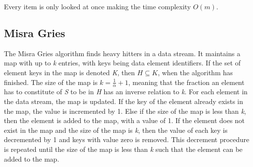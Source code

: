 Every item is only looked at once making the time complexity \(O(m)\).





 
\subsection{Misra Gries}
The Misra Gries algorithm finds heavy hitters in a data stream. It maintains a map with up to \textit{k} entries, with keys being data element identifiers. If the set of element keys in the map is denoted \textit{K}, then \(H \subseteq K\), when the algorithm has finished. The size of the map is \(k = \frac{1}{\alpha} + 1\), meaning that the fraction an element has to constitute of \textit{S} to be in \textit{H} has an inverse relation to \textit{k}.
For each element in the data stream, the map is updated. If the key of the element already exists in the map, the value is incremented by 1. Else if the size of the map is less than \textit{k}, then the element is added to the map, with a value of 1. If the element does not exist in the map and the size of the map is \textit{k}, then the value of each key is decremented by 1 and keys with value zero is removed. This decrement procedure is repeated until the size of the map is less than \textit{k} such that the element can be added to the map.

